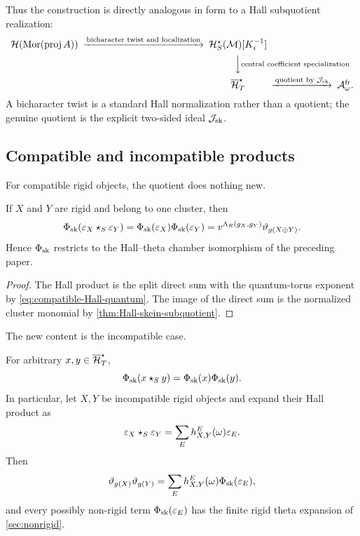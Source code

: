 Thus the construction is directly analogous in form to a Hall subquotient
realization:
\begin{equation}
\begin{CD}
 \Hall(\Mor(\proj A))
 @>{\text{bicharacter twist and localization}}>>
 \Hall_S^\star(\MM)[K_i^{-1}]\\
 @. @VV{\text{central coefficient specialization}}V\\
 @. \Hred @>{\text{quotient by }\Jsk}>> \Aq.
\end{CD}
\label{eq:subquotient-chain}
\end{equation}
A bicharacter twist is a standard Hall normalization rather than a quotient;
the genuine quotient is the explicit two-sided ideal $\mathcal J_{\mathrm{sk}}$.

\subsection{Compatible and incompatible products}

For compatible rigid objects, the quotient does nothing new.

\begin{proposition}
\label{prop:recover-chambers}
If $X$ and $Y$ are rigid and belong to one cluster, then
\begin{equation}
 \Phi_{\rm sk}(\varepsilon_X\star_S\varepsilon_Y)
 =\Phi_{\rm sk}(\varepsilon_X)\Phi_{\rm sk}(\varepsilon_Y)
 =v^{\Lambda_R(g_X,g_Y)}\vartheta_{g(X\oplus Y)}.
 \label{eq:compatible-global-map}
\end{equation}
Hence $\Phi_{\rm sk}$ restricts to the Hall--theta chamber isomorphism of the
preceding paper.
\end{proposition}

\begin{proof}
The Hall product is the split direct sum with the quantum-torus exponent by
\eqref{eq:compatible-Hall-quantum}.  The image of the direct sum is the
normalized cluster monomial by \cref{thm:Hall-skein-subquotient}.
\end{proof}

The new content is the incompatible case.

\begin{theorem}
\label{thm:incompatible-product}
For arbitrary $x,y\in\overline{\mathcal H}_{T}^{\star}$,
\begin{equation}
 \Phi_{\rm sk}(x\star_S y)
 =\Phi_{\rm sk}(x)\Phi_{\rm sk}(y).
 \label{eq:global-multiplicativity}
\end{equation}
In particular, let $X,Y$ be incompatible rigid objects and expand their Hall
product as
\begin{equation}
 \varepsilon_X\star_S\varepsilon_Y
 =\sum_E h_{X,Y}^E(\omega)\varepsilon_E.
 \label{eq:incompatible-Hall-expansion}
\end{equation}
Then
\begin{equation}
 \vartheta_{g(X)}\vartheta_{g(Y)}
 =\sum_E h_{X,Y}^E(\omega)
       \Phi_{\rm sk}(\varepsilon_E),
 \label{eq:Hall-to-theta-structure}
\end{equation}
and every possibly non-rigid term $\Phi_{\rm sk}(\varepsilon_E)$ has the finite
rigid theta expansion of \cref{sec:nonrigid}.
\end{theorem}

